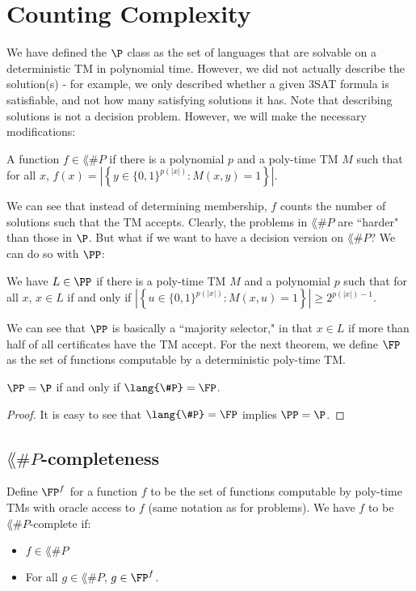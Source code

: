 \section{Counting Complexity}

We have defined the $\P$ class as the set of languages that are solvable on a deterministic TM in polynomial time. However, we did not actually describe the solution(s) - for example, we only described whether a given 3SAT formula is satisfiable, and not how many satisfying solutions it has. Note that describing solutions is not a decision problem. However, we will make the necessary modifications:

\newcommand{\SharpP}{\lang{\#P}}
\begin{definition}
A function $f \in \SharpP$ if there is a polynomial $p$ and a poly-time TM $M$ such that for all $x$, $f(x) = |\left \{y \in \{0, 1\}^{p(|x|)} \colon M(x, y) = 1\right \}|$.
\end{definition}

We can see that instead of determining membership, $f$ counts the number of solutions such that the TM accepts. Clearly, the problems in $\SharpP$ are ``harder" than those in $\P$. But what if we want to have a decision version on $\SharpP$? We can do so with $\PP$:

\begin{definition}
We have $L \in \PP$ if there is a poly-time TM $M$ and a polynomial $p$ such that for all $x$, $x \in L$ if and only if $|\left\{u \in \{0, 1\}^{p(|x|)} \colon M(x, u) = 1\right\} | \ge 2^{p(|x|)-1}$.
\end{definition}
We can see that $\PP$ is basically a ``majority selector," in that $x \in L$ if more than half of all certificates have the TM accept. For the next theorem, we define $\FP$ as the set of functions computable by a deterministic poly-time TM.

\begin{theorem}
$\PP = \P$ if and only if $\SharpP = \FP$. 
\end{theorem}

\begin{proof}
It is easy to see that $\SharpP = \FP$ implies $\PP = \P$. 
\end{proof}

\subsection{$\SharpP$-completeness}
\begin{definition}
Define $\FP^{f}$ for a function $f$ to be the set of functions computable by poly-time TMs with oracle access to $f$ (same notation as for problems). We have $f$ to be $\SharpP$-complete if:
\begin{itemize}
\item $f \in \SharpP$
\item For all $g \in \SharpP$, $g \in \FP^{f}$.
\end{itemize}
\end{definition}

